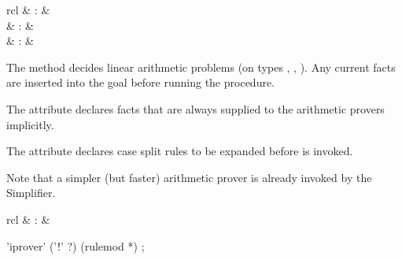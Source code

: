 \begin{isabellebody}
\begin{isamarkuptext}
\end{isamarkuptext}%
\isamarkuptrue%
%
\isamarkuptrue%
%
\begin{isamarkuptext}%
\begin{matharray}{rcl}
    \hypertarget{method.HOL.arith}{\hyperlink{method.HOL.arith}{\mbox{}}} & : &  \\
    \hypertarget{attribute.HOL.arith}{\hyperlink{attribute.HOL.arith}{\mbox{}}} & : &  \\
    \hypertarget{attribute.HOL.arith-split}{\hyperlink{attribute.HOL.arith-split}{\mbox{}}} & : &  \\
  \end{matharray}

  The \hyperlink{method.HOL.arith}{\mbox{}} method decides linear arithmetic problems
  (on types , , ).  Any current
  facts are inserted into the goal before running the procedure.

  The \hyperlink{attribute.HOL.arith}{\mbox{}} attribute declares facts that are
  always supplied to the arithmetic provers implicitly.

  The \hyperlink{attribute.HOL.arith-split}{\mbox{}} attribute declares case split
  rules to be expanded before \hypertarget{method.HOL.arith}{\hyperlink{method.HOL.arith}{\mbox{}}} is invoked.

  Note that a simpler (but faster) arithmetic prover is
  already invoked by the Simplifier.%
\end{isamarkuptext}%
\isamarkuptrue%
%
\isamarkuptrue%
%
\begin{isamarkuptext}%
\begin{matharray}{rcl}
    \hypertarget{method.HOL.iprover}{\hyperlink{method.HOL.iprover}{\mbox{}}} & : &  \\
  \end{matharray}

  \begin{rail}
    'iprover' ('!' ?) (rulemod *)
    ;
  \end{rail}


\end{isamarkuptext}
\end{isabellebody}
